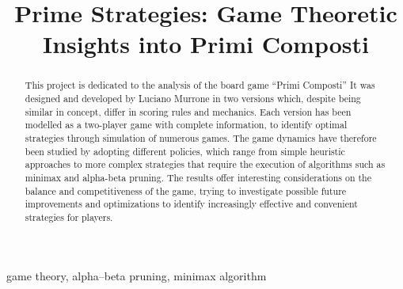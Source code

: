 \documentclass[conference]{IEEEtran}
\begin{document}


\title{Prime Strategies: Game Theoretic Insights into Primi Composti\\
}

\author{
\and
{}
\and
{}
}

\maketitle

\begin{abstract}
This project is dedicated to the analysis of the board game ``Primi Composti'' It was designed and developed by Luciano Murrone in two versions which, despite being similar in concept, differ in scoring rules and mechanics. Each version has been modelled as a two-player game with complete information, to identify optimal strategies through simulation of numerous games. The game dynamics have therefore been studied by adopting different policies, which range from simple heuristic approaches to more complex strategies that require the execution of algorithms such as minimax and alpha-beta pruning. The results offer interesting considerations on the balance and competitiveness of the game, trying to investigate possible future improvements and optimizations to identify increasingly effective and convenient strategies for players. 

\end{abstract}

\begin{IEEEkeywords}
game theory, alpha–beta pruning, minimax algorithm 
\end{IEEEkeywords}
\end{document}
